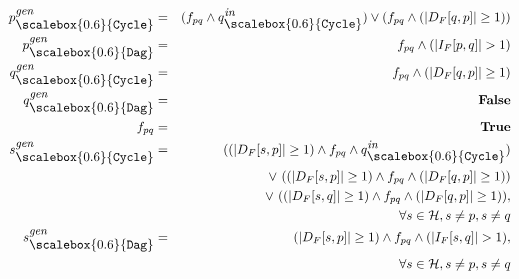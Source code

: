 \documentclass{sig-alternate}
\newcommand{\p}{\ensuremath{p}}
\newcommand{\q}{\ensuremath{q}}
\newcommand{\s}{\ensuremath{s}}
\newcommand{\heap}{\ensuremath{\mathcal{H}}}
\newcommand{\subC}{\mbox{\scalebox{0.6}{\Cycle}}}
\newcommand{\subD}{\mbox{\scalebox{0.6}{\Dag}}}
\newcommand{\din}{\mbox{\footnotesize\em in}}
\newcommand{\dgen}{\mbox{\footnotesize\em gen}}
\newcommand{\GenC}[1]{\ensuremath{{#1}_{\subC}^{\dgen}}}
\newcommand{\GenD}[1]{\ensuremath{{#1}_{\subD}^{\dgen}}}
\newcommand{\InC}[1]{\ensuremath{{#1}_{\subC}^{\din}}}
\newcommand{\num}[1]{\ensuremath{|#1|}}
\newcommand{\DFM}[2]{\ensuremath{D_F[#1,#2]}}
\newcommand{\IFM}[2]{\ensuremath{I_F[#1,#2]}}
\newcommand{\Dag}{{\tt Dag}}
\newcommand{\Cycle}{{\tt Cycle}}
\newcommand{\false}{\textbf{False}}
\newcommand{\true}{\textbf{True}}
\begin{document}
\begin{enumerate}
  \begin{eqnarray*}
    \GenC{p}   &= & (f_{\p\q} \wedge \InC{q}) \vee (f_{\p\q}
    \wedge (\num{\DFM{\q}{\p}} \geq 1)) \\ %
    \GenD{p}   &=&  f_{\p\q} \wedge (\num{\IFM{\p}{\q}} > 1)	\\
    \GenC{q}   &= & f_{\p\q} \wedge (\num{\DFM{\q}{\p}} \geq 1) \\ %
	\GenD{q} &=& \false\\ 
    f_{\p\q} &=& \true \\
    \GenC{\s} &=&  ((\num{\DFM{\s}{\p}} \geq 1) \wedge f_{\p\q}
    \wedge \InC{q}) \\
    && \vee\ ((\num{\DFM{\s}{\p}} \geq 1) \wedge f_{\p\q} \wedge
    (\num{\DFM{\q}{\p}} \geq 1)) \\ 
    && \vee\ ((\num{\DFM{\s}{\q}} \geq 1) \wedge f_{\p\q}
    \wedge (\num{\DFM{\q}{\p}} \geq 1)),  \\ %
    && \qquad \qquad  \forall \s \in \heap, \s \not= \p, \s \not=\q \\
    \GenD{\s}   &=& (\num{\DFM{\s}{\p}} \geq 1) \wedge
    f_{\p\q} \wedge (\num{\IFM{\s}{\q}} > 1), \\ %
    && \qquad \qquad \forall \s \in \heap, \s \not= \p, \s \not=\q 
  \end{eqnarray*}


\end{enumerate}
\end{document}
